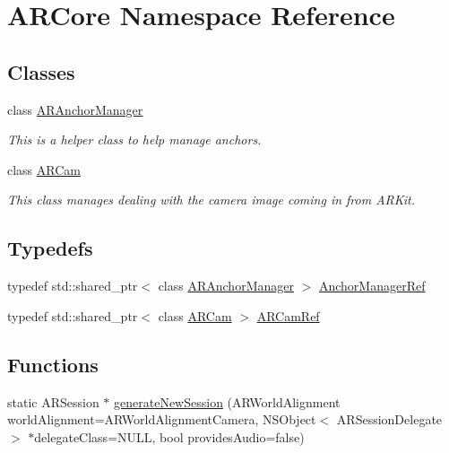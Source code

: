 \hypertarget{namespace_a_r_core}{}\section{A\+R\+Core Namespace Reference}
\label{namespace_a_r_core}
\subsection*{Classes}
\begin{DoxyCompactItemize}
\item 
class \hyperlink{class_a_r_core_1_1_a_r_anchor_manager}{A\+R\+Anchor\+Manager}
\begin{DoxyCompactList}\small\item\em This is a helper class to help manage anchors. \end{DoxyCompactList}\item 
class \hyperlink{class_a_r_core_1_1_a_r_cam}{A\+R\+Cam}
\begin{DoxyCompactList}\small\item\em This class manages dealing with the camera image coming in from A\+R\+Kit. \end{DoxyCompactList}\end{DoxyCompactItemize}
\subsection*{Typedefs}
\begin{DoxyCompactItemize}
\item 
typedef std\+::shared\+\_\+ptr$<$ class \hyperlink{class_a_r_core_1_1_a_r_anchor_manager}{A\+R\+Anchor\+Manager} $>$ \hyperlink{namespace_a_r_core_a3f2b9ba00b51ce19c1010f554a66a512}{Anchor\+Manager\+Ref}
\item 
typedef std\+::shared\+\_\+ptr$<$ class \hyperlink{class_a_r_core_1_1_a_r_cam}{A\+R\+Cam} $>$ \hyperlink{namespace_a_r_core_a4ebe9e23907235fcf76bf65440fde0e0}{A\+R\+Cam\+Ref}
\end{DoxyCompactItemize}
\subsection*{Functions}
\begin{DoxyCompactItemize}
\item 
static A\+R\+Session $\ast$ \hyperlink{namespace_a_r_core_ab1e11f8de09a3f533f6ed38f93feb504}{generate\+New\+Session} (A\+R\+World\+Alignment world\+Alignment=A\+R\+World\+Alignment\+Camera, N\+S\+Object$<$ A\+R\+Session\+Delegate $>$ $\ast$delegate\+Class=N\+U\+LL, bool provides\+Audio=false)
\end{DoxyCompactItemize}


